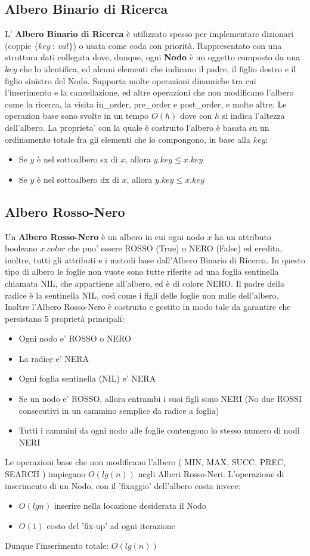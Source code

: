 \documentclass{article}
\begin{document}
\subsection{Albero Binario di Ricerca}
L' \textbf{Albero Binario di Ricerca} è utilizzato spesso per implementare dizionari (coppie $\{key\ :\ val\}$) o usata come coda con priorità. Rappresentato con una struttura dati collegata dove, dunque, ogni \textbf{Nodo} è un oggetto composto da una $key$ che lo identifica, ed alcuni elementi che indicano il padre, il figlio destro e il figlio sinistro del Nodo.
Supporta molte operazioni dinamiche tra cui l'inserimento e la cancellazione, ed altre operazioni che non modificano l'albero come la ricerca, la visita in\_order, pre\_order e post\_order, e molte altre.
Le operazion base sono svolte in un tempo $O(h)$ dove con $h$ si indica l'altezza dell'albero.
La proprieta' con la quale è costruito l'albero è basata su un ordinamento totale fra gli elementi che lo compongono, in base alla $key$:
\begin{itemize}
\item Se $y$ è nel sottoalbero sx di $x$, allora $y.key \leq x.key$
\item Se $y$ è nel sottoalbero dx di $x$, allora $y.key \leq x.key$
\end{itemize}
\subsection{Albero Rosso-Nero}
Un \textbf{Albero Rosso-Nero} è un albero in cui ogni nodo $x$ ha un attributo booleano $x.color$ che puo' essere ROSSO (True) o NERO (False) ed eredita, inoltre, tutti gli attributi e i metodi base dall'Albero Binario di Ricerca. In questo tipo di albero le foglie non vuote sono tutte riferite ad una foglia sentinella chiamata NIL, che appartiene all'albero, ed è di colore NERO. Il padre della radice è la sentinella NIL, così come i figli delle foglie non nulle dell'albero.
Inoltre l'Albero Rosso-Nero è costruito e gestito in modo tale da garantire che persistano 5 proprietà principali:
\begin{itemize}
\item Ogni nodo e' ROSSO o NERO
\item La radice e' NERA
\item Ogni foglia sentinella (NIL) e' NERA
\item Se un nodo e' ROSSO, allora entrambi i suoi figli sono NERI (No due ROSSI consecutivi in un cammino semplice da radice a foglia)
\item Tutti i cammini da ogni nodo alle foglie contengono lo stesso numero di nodi NERI
\end{itemize}
Le operazioni base che non modificano l'albero ( MIN, MAX, SUCC, PREC, SEARCH ) impiegano $O(lg(n))$ negli Alberi Rosso-Neri.
L'operazione di inserimento di un Nodo, con il 'fixaggio' dell'albero costa invece:
\begin{itemize}
\item $O(lgn)$ inserire nella locazione desiderata il Nodo
\item $O(1)$ costo del 'fix-up' ad ogni iterazione
\end{itemize}
Dunque l'inserimento totale: $O(lg(n))$
\end{document}

